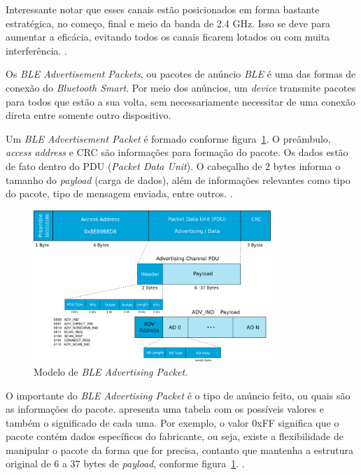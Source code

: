 \documentclass[
		12pt,				%
		openright,			%
		oneside,			%
		a4paper,			%
		chapter=TITLE,		%
		english,			%
		brazil				%
	]{abntex2}
\begin{document}
Interessante notar que esses canais estão posicionados em forma bastante estratégica, no começo, final e meio da banda de 2.4 GHz. Isso se deve para aumentar a eficácia, evitando todos os canais ficarem lotados ou com muita interferência. \cite{ble-packets}. 

Os \textit{BLE Advertisement Packets}, ou pacotes de anúncio \textit{BLE} é uma das formas de conexão do \textit{Bluetooth Smart}. Por meio dos anúncios, um \textit{device} transmite pacotes para todos que estão a sua volta, sem necessariamente necessitar de uma conexão direta entre somente outro dispositivo.

Um \textit{BLE Advertisement Packet} é formado conforme figura~\ref{fig:ble-adv-packet}. O preâmbulo, \textit{access address} e CRC são informações para formação do pacote. Os dados estão de fato dentro do PDU (\textit{Packet Data Unit}). O cabeçalho de 2 bytes informa o tamanho do \textit{payload} (carga de dados), além de informações relevantes como tipo do pacote, tipo de mensagem enviada, entre outros. \cite{ble-packets}.

\begin{figure}[htb]
	\caption{\label{fig:ble-adv-packet}Modelo de \textit{BLE Advertising Packet}.}
	\begin{center}
		\includegraphics[width=0.8\textwidth]{img/ble-adv-packet.png}
	\end{center}
\end{figure}

O importante do \textit{BLE Advertising Packet} é o tipo de anúncio feito, ou quais são as informações do pacote.  apresenta uma tabela com os possíveis valores e também o significado de cada uma. Por exemplo, o valor 0xFF significa que o pacote contém dados específicos do fabricante, ou seja, existe a flexibilidade de manipular o pacote da forma que for precisa, contanto que mantenha a estrutura original de 6 a 37 bytes de \textit{payload}, conforme figura~\ref{fig:ble-adv-packet}. \cite{ble-packets}.
\end{document}
